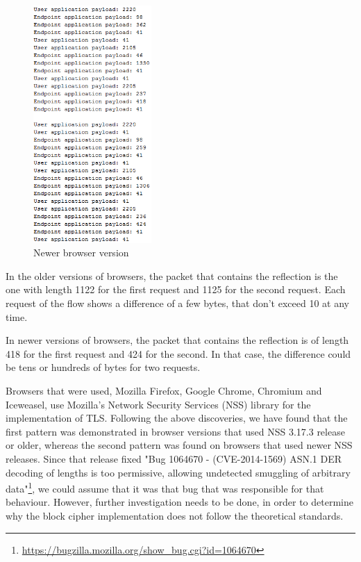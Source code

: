 \begin{figure}[H] \caption{Newer browser version} \centering
\includegraphics[width=0.4\textwidth]{diagrams/newer_browser_version.png}\end{figure}

In the older versions of browsers, the packet that contains the reflection is
the one with length 1122 for the first request and 1125 for the second request.
Each request of the flow shows a difference of a few bytes, that don't exceed 10
at any time.

In newer versions of browsers, the packet that contains the reflection is of
length 418 for the first request and 424 for the second. In that case, the
difference could be tens or hundreds of bytes for two requests.

Browsers that were used, Mozilla Firefox, Google Chrome, Chromium and Iceweasel,
use Mozilla's Network Security Services (NSS) library for the implementation of
TLS. Following the above discoveries, we have found that the first pattern was
demonstrated in browser versions that used NSS 3.17.3 release or older, whereas
the second pattern was found on browsers that used newer NSS releases. Since
that release fixed "Bug 1064670 - (CVE-2014-1569) ASN.1 DER decoding of lengths
is too permissive, allowing undetected smuggling of arbitrary
data"\footnote{\url{https://bugzilla.mozilla.org/show_bug.cgi?id=1064670}}, we
could assume that it was that bug that was responsible for that behaviour.
However, further investigation needs to be done, in order to determine why the
block cipher implementation does not follow the theoretical standards.

